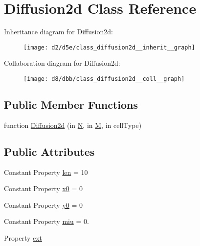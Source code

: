 \hypertarget{class_diffusion2d}{}\section{Diffusion2d Class Reference}
\label{class_diffusion2d}


Inheritance diagram for Diffusion2d\+:
\nopagebreak
\begin{figure}[H]
\begin{center}
\leavevmode
\texttt{[image: d2/d5e/class\_diffusion2d\_\_inherit\_\_graph]}
\end{center}
\end{figure}


Collaboration diagram for Diffusion2d\+:
\nopagebreak
\begin{figure}[H]
\begin{center}
\leavevmode
\texttt{[image: d8/dbb/class\_diffusion2d\_\_coll\_\_graph]}
\end{center}
\end{figure}
\subsection*{Public Member Functions}
\begin{DoxyCompactItemize}
\item 
function \hyperlink{class_diffusion2d_ae5f63ce788dd5c3ddd789fd764f03472}{Diffusion2d} (in \hyperlink{class_diffusion_abstract2d_a58f5ba93eb64f8834186ac7831c7a5a2}{N}, in \hyperlink{class_diffusion_abstract2d_ae24f2afba1fab7ed9f4b570ee7bdf7a6}{M}, in cell\+Type)
\end{DoxyCompactItemize}
\subsection*{Public Attributes}
\begin{DoxyCompactItemize}
\item 
Constant Property \hyperlink{class_diffusion2d_aa94b73fa9de9518db5f629ca1633f9a6}{len} = 10
\item 
Constant Property \hyperlink{class_diffusion2d_ab2d897f02ea708eb701834384bdd2d9f}{x0} = 0
\item 
Constant Property \hyperlink{class_diffusion2d_ac1523513a40fbb1eb083bdcba1bc2239}{y0} = 0
\item 
Constant Property \hyperlink{class_diffusion2d_ae05e974ed4809e0df4c9aa502366bd66}{miu} = 0.
\item 
Property \hyperlink{class_diffusion2d_abaf2168972f0d76ab8a4433ae5304c9a}{ext}
\end{DoxyCompactItemize}
